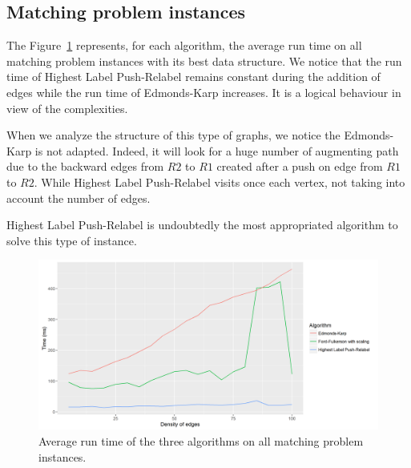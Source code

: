 \subsection{Matching problem instances}
The Figure~\ref{fig:meanmatchingproblem} represents, for each algorithm, the average run time on all matching problem instances with its best data structure. We notice that the run time of Highest Label Push-Relabel remains constant during the addition of edges while the run time of Edmonds-Karp increases. It is a logical behaviour in view of the complexities.

When we analyze the structure of this type of graphs, we notice the Edmonds-Karp is not adapted. Indeed, it will look for a huge number of augmenting path due to the backward edges from $R2$ to $R1$ created after a push on edge from $R1$ to $R2$. While Highest Label Push-Relabel visits once each vertex, not taking into account the number of edges.

Highest Label Push-Relabel is undoubtedly the most appropriated algorithm to solve this type of instance. 

\begin{figure}[H]
\begin{center}
\includegraphics[scale=0.6]{images/meanmatching.png}
\caption{Average run time of the three algorithms on all matching problem instances.}
\label{fig:meanmatchingproblem}
\end{center}
\end{figure}
